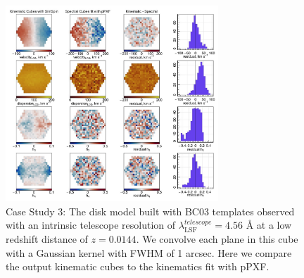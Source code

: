 \documentclass[
  journal=pasa,
  manuscript=research-paper, %
  year=2020,
  volume=37,
]{cup-journal}
\begin{document}
\begin{figure}
    \centering
    \includegraphics[keepaspectratio, width=8cm]{Figures/cs4_disk_velocities_lowz_fwhm_blur_BC03.jpeg}
    \caption{Case Study 3: The disk model built with BC03 templates observed with an intrinsic telescope resolution of  $\lambda_{\text{LSF}}^{telescope} = 4.56$ \AA{} at a low redshift distance of $z = 0.0144$. We convolve each plane in this cube with a Gaussian kernel with FWHM of 1 arcsec. Here we compare the output kinematic cubes to the kinematics fit with pPXF.}
    \label{fig:cs4_disk_lowz_BC03}
\end{figure}
\end{document}
